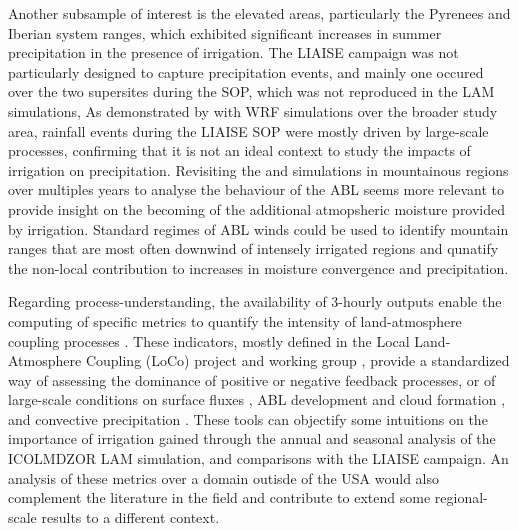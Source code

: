 Another subsample of interest is the elevated areas, particularly the Pyrenees and Iberian system ranges, which exhibited significant increases in summer precipitation in the presence of irrigation. 
The LIAISE campaign was not particularly designed to capture precipitation events, and mainly one occured over the two supersites during the SOP, which was not reproduced in the LAM simulations, 
As demonstrated by \citet{udina_irrigation_2024} with WRF simulations over the broader study area, rainfall events during the LIAISE SOP were mostly driven by large-scale processes, confirming that it is not an ideal context to study the impacts of irrigation on precipitation.
Revisiting the \noirr and \irr simulations in mountainous regions over multiples years to analyse the behaviour of the ABL seems more relevant to provide insight on the becoming of the additional atmopsheric moisture provided by irrigation.
Standard regimes of ABL winds could be used to identify mountain ranges that are most often downwind of intensely irrigated regions and qunatify the non-local contribution to increases in moisture convergence and precipitation.

Regarding process-understanding, the availability of 3-hourly outputs enable the computing of specific metrics to quantify the intensity of land-atmosphere coupling processes \citep{findell_accurate_2024}.
These indicators, mostly defined in the Local Land-Atmosphere Coupling (LoCo) project and working group \citep{santanello_landatmosphere_2018}, provide a standardized way of assessing the dominance of positive or negative feedback processes, or of large-scale conditions on surface fluxes \citep{dirmeyer_terrestrial_2011}, ABL development and cloud formation \citep{dirmeyer_intensified_2014,hay-chapman_novel_2023}, and convective precipitation \citep{findell_probability_2011, chen_impacts_2017}.
These tools can objectify some intuitions on the importance of irrigation gained through the annual and seasonal analysis of the ICOLMDZOR LAM simulation, and comparisons with the LIAISE campaign. 
An analysis of these metrics over a domain outisde of the USA would also complement the literature in the field and contribute to extend some regional-scale results to a different context.

